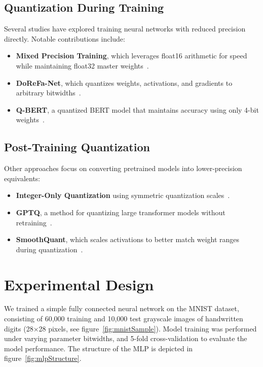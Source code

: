 \documentclass[11pt]{article}
\begin{document}
\subsection*{Quantization During Training}
Several studies have explored training neural networks with reduced precision
directly. Notable contributions include:
\begin{itemize}
	\item \textbf{Mixed Precision Training}, which leverages float16 arithmetic for speed while maintaining float32 master weights~\cite{micikevicius2017mixed}.
	\item \textbf{DoReFa-Net}, which quantizes weights, activations, and gradients to arbitrary bitwidths~\cite{zhou2018dorefa}.
	\item \textbf{Q-BERT}, a quantized BERT model that maintains accuracy using only 4-bit weights~\cite{shen2020qbert}.
\end{itemize}

\subsection*{Post-Training Quantization}
Other approaches focus on converting pretrained models into lower-precision
equivalents:
\begin{itemize}
	\item \textbf{Integer-Only Quantization} using symmetric quantization scales~\cite{jacob2018quantization}.
	\item \textbf{GPTQ}, a method for quantizing large transformer models without retraining~\cite{frantar2022gptq}.
	\item \textbf{SmoothQuant}, which scales activations to better match weight ranges during quantization~\cite{xiao2024smoothquant}.
\end{itemize}

\newpage

\section{Experimental Design}

We trained a simple fully connected neural network on the MNIST dataset,
consisting of 60,000 training and 10,000 test grayscale images of handwritten
digits (28×28 pixels, see figure~\ref{fig:mnistSample}). Model training was
performed under varying parameter bitwidths, and 5-fold cross-validation to
evaluate the model performance. The structure of the MLP is depicted in
figure~\ref{fig:mlpStructure}.
\end{document}
